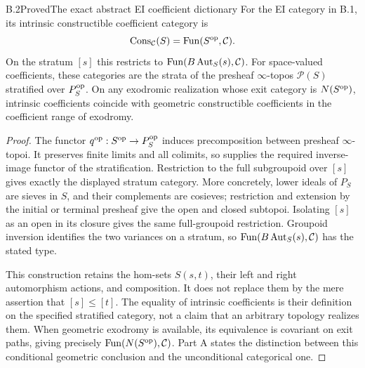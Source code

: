 \begin{statement}{B.2}{Proved}{The exact abstract EI coefficient dictionary}
For the EI category in B.1, its intrinsic constructible coefficient
category is
\[
 \operatorname{Cons}_{\mathcal C}(S)=\operatorname{Fun}(S^{\mathrm{op}},\mathcal C).
\]
On the stratum $[s]$ this restricts to
$\operatorname{Fun}(B\operatorname{Aut}_S(s),\mathcal C)$. For space-valued coefficients, these categories
are the strata of the presheaf $\infty$-topos $\mathcal P(S)$ stratified
over $P_S^{\mathrm{op}}$. On any exodromic realization whose exit category is
$N(S^{\mathrm{op}})$, intrinsic coefficients coincide with geometric
constructible coefficients in the coefficient range of exodromy.
\end{statement}
\begin{proof}
The functor $q^{\mathrm{op}}:S^{\mathrm{op}}\to P_S^{\mathrm{op}}$ induces precomposition
between presheaf $\infty$-topoi. It preserves finite limits and all
colimits, so supplies the required inverse-image functor of the
stratification. Restriction to the full subgroupoid over $[s]$ gives
exactly the displayed stratum category. More concretely, lower ideals
of $P_S$ are sieves in $S$, and their complements are cosieves; restriction
and extension by the initial or terminal presheaf give the open and
closed subtopoi. Isolating $[s]$ as an open in its closure gives the same
full-groupoid restriction. Groupoid inversion identifies the two
variances on a stratum, so $\operatorname{Fun}(B\operatorname{Aut}_S(s),\mathcal C)$ has the stated type.

This construction retains the hom-sets $S(s,t)$, their left and right
automorphism actions, and composition. It does not replace them by the
mere assertion that $[s]\leq[t]$. The equality of intrinsic coefficients
is their definition on the specified stratified category, not a claim
that an arbitrary topology realizes them. When geometric exodromy is
available, its equivalence is covariant on exit paths, giving precisely
$\operatorname{Fun}(N(S^{\mathrm{op}}),\mathcal C)$. Part A states the distinction between this
conditional geometric conclusion and the unconditional categorical one.
\end{proof}

